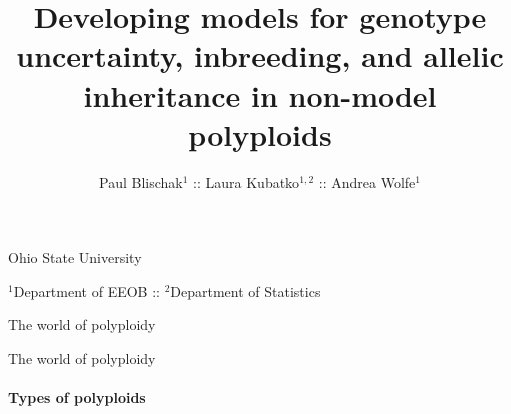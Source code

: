 \documentclass[presentation,sansserif]{beamer}
\title[Developing pop-gen models for polyploids]{Developing models for genotype uncertainty, inbreeding, and allelic inheritance in non-model polyploids}
\author[Blischak \textit{et al}.]{Paul Blischak$^1$ :: Laura Kubatko$^{1,2}$ :: Andrea Wolfe$^1$}
\date{}
\begin{document}
\beamertemplatenavigationsymbolsempty

\begin{frame}[plain]
	\vspace{-1.2in}
	\titlepage
	
	\vspace{-1.2in}
	\begin{center}
	
		{\footnotesize Ohio State University 	
		\vspace{0.05in}
		
		$^1$Department of EEOB :: $^2$Department of Statistics
		}		
	\end{center}
	\vspace{-0.2in}
		
\end{frame}


\begin{frame}[t]{The world of polyploidy}

  

\end{frame}

\begin{frame}[t]{The world of polyploidy}
\framesubtitle{Types of polyploids}


	\begin{center}
	\end{center}
	
	
	\begin{center}
	\end{center}

\end{frame}
\end{document}

